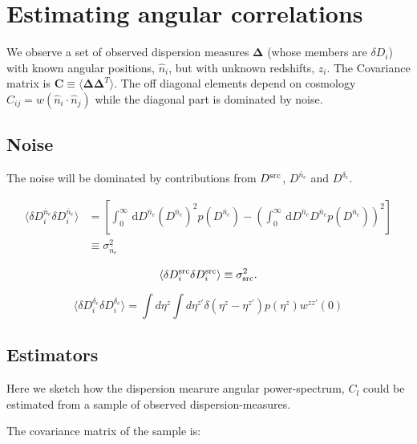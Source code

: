 \documentclass[onecolumn,prd,noshowpacs,nofootinbib,amsmath,amssymb]{revtex4}
\newcommand{\Dne}{D^{\bar{n}_e}}
\newcommand{\Dde}{D^{\delta_e}}
\newcommand{\Dsrc}{D^{\rm src}}
\newcommand{\ud}{\,\mathrm{d}}
\begin{document}
\section{Estimating angular correlations}

We observe a set of observed dispersion measures
$\boldsymbol \Delta$ (whose members are $\delta D_i$)
with known angular positions, $\hat n_i$, but with unknown
redshifts, $z_i$.  The Covariance matrix is
${\boldsymbol C} \equiv
\langle \boldsymbol \Delta \boldsymbol \Delta^T \rangle$.
The off diagonal elements depend on cosmology
$C_{ij} = w(\hat{n}_i\cdot\hat{n}_j)$ while the diagonal part is dominated by noise.

\subsection{Noise}

The noise will be dominated by contributions from $\Dsrc$, $\Dne$ and $\Dde$.

\begin{align}
    \label{e:sig_nebar}
    \langle \delta D^{\bar{n}_e}_i \delta D^{\bar{n}_e}_i \rangle
        &= \left[ \int_0^\infty \ud D^{\bar{n}_e} (D^{\bar{n}_e})^2
            p(D^{\bar{n}_e})
            - \left( \int_0^\infty \ud D^{\bar{n}_e} D^{\bar{n}_e}
        p(D^{\bar{n}_e}) \right)^2 \right]\\
        &\equiv  \sigma_{\bar{n}_e}^2
\end{align}

\begin{equation}
    \label{e:sig_src}
    \langle \delta D^{\rm src}_i \delta D^{\rm src}_i \rangle
    \equiv \sigma^2_{\rm src}.
\end{equation}

\begin{equation}
    \label{e:sig_delta}
    \langle \delta \Dde_i \delta \Dde_i \rangle
		= \int d\eta^z \int d\eta^{z'} \delta(\eta^z - \eta^{z'}) 
		p(\eta^{z}) w^{z z'}(0)
\end{equation}

\subsection{Estimators}

Here we sketch how the dispersion mearure angular power-spectrum, $C_l$
could be estimated from a sample of observed dispersion-measures.

The covariance matrix of the sample is:
\end{document}
